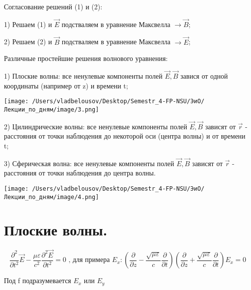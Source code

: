\documentclass[12pt, a4paper]{report}
\begin{document}
Согласование решений (1) и (2): 

1) Решаем (1) и \( \vec{E} \)  подстваляем в уравнение Максвелла \( \to  \vec{B} \);

2) Решаем (2) и \( \vec{B} \)  подстваляем в уравнение Максвелла \( \to  \vec{E} \);

Различные простейшие решения волнового уравнения: 

1) Плоские волны: все ненулевые компоненты полей \( \vec{ E} ,\vec{ B} \) завися от одной координаты (например от z)  и времени t; 

\begin{center}
    \texttt{[image: /Users/vladbelousov/Desktop/Semestr\_4-FP-NSU/ЭиО/Лекции\_по\_дням/image/3.png]}
\end{center}


2) Цилиндрические волны: все ненулевые компоненты полей \( \vec{ E} ,\vec{ B} \) зависят от \( \vec{ r}  \)  - расстояния от точки наблюдения до некоторой оси (центра волны) и от времени t; 

3) Сферическая волна: все ненулевые компоненты полей \( \vec{ E} ,\vec{ B} \) зависят от \( \vec{r}  \)  - расстояния от точки наблюдения до центра волны.

\begin{center}
    \texttt{[image: /Users/vladbelousov/Desktop/Semestr\_4-FP-NSU/ЭиО/Лекции\_по\_дням/image/4.png]}
\end{center}

\section{Плоские волны. }

\[ \frac{\partial ^2 }{\partial t^2 } \vec{E} - \frac{\mu \varepsilon}{c ^2} \frac{\partial ^2 \vec{ E}}{\partial t ^2 } =0 \text{ , для примера }  E_x : \left( \frac{\partial}{\partial z} - \frac{\sqrt{\mu \varepsilon} }{c} \frac{\partial}{\partial t }   \right) \left( \frac{\partial}{\partial z} + \frac{\sqrt{\mu \varepsilon} }{c} \frac{\partial}{\partial t } \right) E_x = 0    \] 

Под f подразумевается \( E_x  \) или \( E_y \)  
\end{document}
